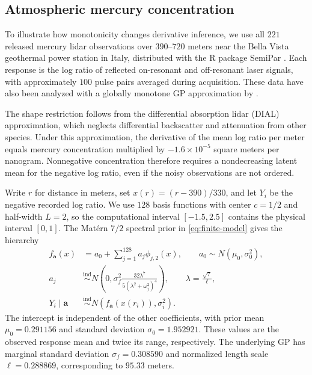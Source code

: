 \subsection{Atmospheric mercury concentration}\label{sec:lidar}

To illustrate how monotonicity changes derivative inference, we use
all $221$ released mercury lidar observations over
$390$--$720$ meters near the Bella Vista geothermal power station in
Italy, distributed with the R package SemiPar
\citep{holst1996lidar,feng2022sshaped}. Each response is the log ratio
of reflected on-resonant and off-resonant laser signals, with
approximately $100$ pulse pairs averaged during acquisition.
These data have also been analyzed with a globally monotone GP
approximation by \citet{maatouk2025bayesian}.

The shape restriction follows from the differential absorption lidar
(DIAL) approximation, which neglects differential backscatter and
attenuation from other species. Under this approximation, the derivative
of the mean log ratio per meter equals mercury concentration multiplied
by $-1.6\times10^{-5}$ square meters per nanogram. Nonnegative
concentration therefore requires a nondecreasing latent mean for the
negative log ratio, even if the noisy observations are not ordered.

Write $r$ for distance in meters, set $x(r)=(r-390)/330$, and let $Y_i$
be the negative recorded log ratio. We use $128$ basis functions with
center $c=1/2$ and half-width $L=2$, so the computational interval
$[-1.5,2.5]$ contains the physical interval $[0,1]$.
The Mat\'{e}rn $7/2$ spectral prior in \cref{eq:finite-model} gives
the hierarchy
\[
\begin{aligned}
 f_{\boldsymbol a}(x)&=a_0+\sum_{j=1}^{128}a_j\phi_{j,2}(x),
 \qquad a_0\sim N(\mu_0,\sigma_0^2),\\
 a_j&\overset{\mathrm{ind}}\sim
 N\left(0,\sigma_f^2\frac{32\lambda^7}{5(\lambda^2+\omega_j^2)^4}\right),
 \qquad \lambda=\frac{\sqrt7}{\ell},\\
 Y_i\mid\boldsymbol a&\overset{\mathrm{ind}}\sim
 N(f_{\boldsymbol a}(x(r_i)),\sigma_i^2).
\end{aligned}
\]
The intercept is independent of the other coefficients, with prior
mean $\mu_0=0.291156$ and standard deviation $\sigma_0=1.952921$.
These values are the observed response mean and twice its range,
respectively. The underlying
GP has marginal standard deviation $\sigma_f=0.308590$ and normalized
length scale $\ell=0.288869$, corresponding to $95.33$ meters.

